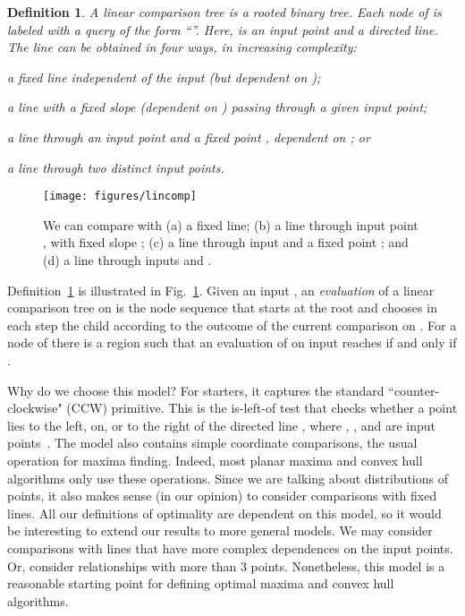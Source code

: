 \documentclass[letterpaper,11pt]{article}
\newtheorem{definition}[theorem]{Definition}
\begin{document}
\begin{definition}\label{def:opt} 
  A \emph{linear comparison tree}  
  is a rooted binary tree. Each 
  node  of  is labeled with 
  a query of the form ``''. 
  Here,  is an input point and 
   a directed line. The 
  line  can be obtained 
  in four ways, in increasing complexity:
  \begin{asparaenum}
    \item\label{type:I} 
      a fixed line independent of 
      the input \textup(but dependent
      on \textup);
     \item\label{type:II} 
       a line with a fixed slope 
       \textup(dependent on \textup) 
       passing through a given input point;
     \item\label{type:III} 
       a line through an input point and 
       a fixed point , dependent on ; or
     \item\label{type:IV} 
       a line through two distinct input points. 
  \end{asparaenum}
\end{definition}

\begin{figure}
  \centering
  \texttt{[image: figures/lincomp]}
  \caption{
    We can compare with (a) a fixed line;
    (b) a line through input point , 
    with fixed slope ; 
    (c) a line through input  and a 
    fixed point ; and (d) a line through 
    inputs  and .
  }
  \label{fig:lincomp}
\end{figure}

Definition~\ref{def:opt} is illustrated 
in Fig.~\ref{fig:lincomp}. 
Given an input , an 
\emph{evaluation} of a linear 
comparison tree  on  
is the node sequence 
that starts at the root 
and chooses in each step
the child according to the 
outcome of the current 
comparison on . 
For a node  of 
there is a region 
 such 
that an evaluation of  
on input  reaches  if and only 
if . 

Why do we choose this model? 
For starters, it captures the standard ``counter-clockwise" (CCW) primitive. 
This is the is-left-of test that checks
whether a point  lies to the left, 
on, or to the right of the directed line 
, where , , and  are
input points~\cite{deBergChvKrOv08}.
The model also contains simple coordinate comparisons, the usual operation for maxima finding. Indeed, most planar maxima and convex hull algorithms only use these operations. Since we are talking about distributions of points, it also makes sense (in our opinion) to consider comparisons with fixed lines. All our definitions of optimality are dependent on this model,
so it would be interesting to extend our results to more general models. We may consider
comparisons with lines that have more complex dependences on the input points. Or, consider
relationships with more than 3 points. Nonetheless, this model is a reasonable starting point
for defining optimal maxima and convex hull algorithms.
\end{document}
